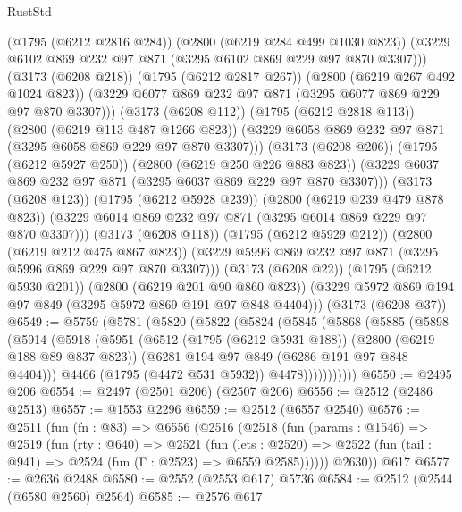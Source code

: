 \begin{lexlean}{RustStd}
\begin{coremodule}
                  (@1795 (@6212 @2816 @284))
                  (@2800 (@6219 @284 @499 @1030 @823))
                  (@3229 @6102 @869 @232 @97 @871 (@3295 @6102 @869 @229 @97 @870 @3307)))
                (@3173 (@6208 @218))
                (@1795 (@6212 @2817 @267))
                (@2800 (@6219 @267 @492 @1024 @823))
                (@3229 @6077 @869 @232 @97 @871 (@3295 @6077 @869 @229 @97 @870 @3307)))
              (@3173 (@6208 @112))
              (@1795 (@6212 @2818 @113))
              (@2800 (@6219 @113 @487 @1266 @823))
              (@3229 @6058 @869 @232 @97 @871 (@3295 @6058 @869 @229 @97 @870 @3307)))
            (@3173 (@6208 @206))
            (@1795 (@6212 @5927 @250))
            (@2800 (@6219 @250 @226 @883 @823))
            (@3229 @6037 @869 @232 @97 @871 (@3295 @6037 @869 @229 @97 @870 @3307)))
          (@3173 (@6208 @123))
          (@1795 (@6212 @5928 @239))
          (@2800 (@6219 @239 @479 @878 @823))
          (@3229 @6014 @869 @232 @97 @871 (@3295 @6014 @869 @229 @97 @870 @3307)))
        (@3173 (@6208 @118))
        (@1795 (@6212 @5929 @212))
        (@2800 (@6219 @212 @475 @867 @823))
        (@3229 @5996 @869 @232 @97 @871 (@3295 @5996 @869 @229 @97 @870 @3307)))
      (@3173 (@6208 @22))
      (@1795 (@6212 @5930 @201))
      (@2800 (@6219 @201 @90 @860 @823))
      (@3229 @5972 @869 @194 @97 @849 (@3295 @5972 @869 @191 @97 @848 @4404)))
    (@3173 (@6208 @37))
@6549 := @5759
    (@5781
      (@5820
        (@5822
          (@5824
            (@5845
              (@5868
                (@5885
                  (@5898
                    (@5914
                      (@5918
                        (@5951
                          (@6512
                            (@1795 (@6212 @5931 @188))
                            (@2800 (@6219 @188 @89 @837 @823))
                            (@6281 @194 @97 @849 (@6286 @191 @97 @848 @4404)))
                          @4466
                          (@1795 (@4472 @531 @5932))
                          @4478)))))))))))
@6550 := @2495 @206
@6554 := @2497 (@2501 @206) (@2507 @206)
@6556 := @2512 (@2486 @2513)
@6557 := @1553 @2296
@6559 := @2512 (@6557 @2540)
@6576 := @2511
    (fun (fn : @83) =>
    @6556
      (@2516
        (@2518
          (fun (params : @1546) =>
          @2519
            (fun (rty : @640) =>
            @2521
              (fun (lets : @2520) =>
              @2522 (fun (tail : @941) => @2524 (fun (Γ : @2523) => @6559 @2585))))))
        @2630))
    @617
@6577 := @2636 @2488
@6580 := @2552 (@2553 @617) @5736
@6584 := @2512 (@2544 (@6580 @2560) @2564)
@6585 := @2576 @617

\end{coremodule}
\end{lexlean}
